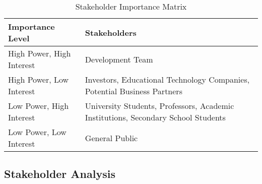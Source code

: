 \begin{table}[ht]
    \centering
    \begin{tabularx}{\linewidth}{|l|X|}
        \rowcolor{gray!70}
        \hline
        \textbf{Importance Level} & \textbf{Stakeholders} \\ 
        \hline
        High Power, High Interest & Development Team \\ 
        \hline
        High Power, Low Interest & Investors, Educational Technology Companies, Potential Business Partners \\ 
        \hline
        Low Power, High Interest & University Students, Professors, Academic Institutions, Secondary School Students \\ 
        \hline
        Low Power, Low Interest & General Public \\ 
        \hline
    \end{tabularx}
    \caption{Stakeholder Importance Matrix}
    \label{tab:stakeholder-importance}
\end{table}


\subsection{Stakeholder Analysis}

